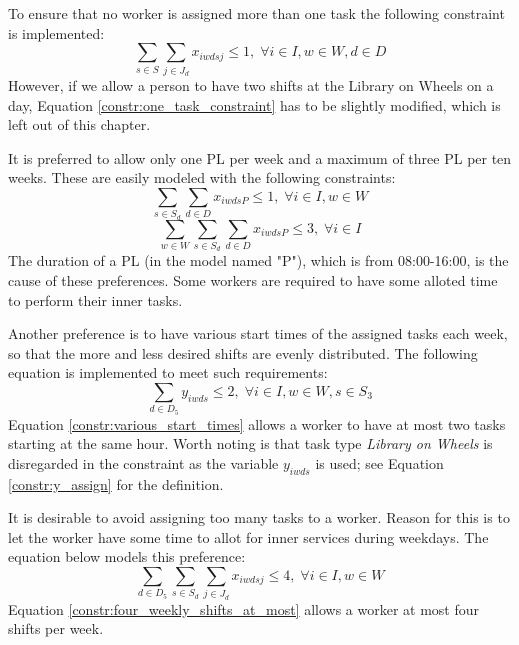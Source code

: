 To ensure that no worker is assigned more than one task the following constraint is implemented:
\begin{equation} \label{constr:one_task_constraint}
\sum_{s\in S}\sum_{j\in J_d} x_{iwdsj} \leq 1, \; \forall i\in I, w \in W, d\in D
\end{equation}
However, if we allow a person to have two shifts at the Library on Wheels on a day, Equation \ref{constr:one_task_constraint} has to be slightly modified, which is left out of this chapter.

It is preferred to allow only one PL per week and a maximum of three PL per ten weeks. These are easily modeled with the following constraints:
\begin{equation} \label{constr:one_PL}
\sum_{s \in S_d}\sum_{d \in D} x_{iwdsP} \leq 1, \; \forall i\in I, w \in W
\end{equation}
\begin{equation} \label{constr:three_PL}
\sum_{w \in W}\sum_{s \in S_d}\sum_{d \in D} x_{iwdsP} \leq 3, \; \forall i\in I
\end{equation}
The duration of a PL (in the model named "P"), which is from 08:00-16:00, is the cause of these preferences. Some workers are required to have some alloted time to perform their inner tasks.

Another preference is to have various start times of the assigned tasks each week, so that the more and less desired shifts are evenly distributed. The following equation is implemented to meet such requirements:
\begin{equation} \label{constr:various_start_times}
\sum_{d \in D_5} y_{iwds} \leq 2, \; \forall i\in I, w \in W, s \in S_3
\end{equation}
Equation \ref{constr:various_start_times} allows a worker to have at most two tasks starting at the same hour. Worth noting is that task type \textit{Library on Wheels} is disregarded in the constraint as the variable $y_{iwds}$ is used; see Equation \ref{constr:y_assign} for the definition.

It is desirable to avoid assigning too many tasks to a worker. Reason for this is to let the worker have some time to allot for inner services during weekdays. The equation below models this preference:
\begin{equation} \label{constr:four_weekly_shifts_at_most}
\sum_{d \in D_5}\sum_{s \in S_d}\sum_{j \in J_d} x_{iwdsj} \leq 4, \; \forall i\in I, w \in W
\end{equation}
Equation \ref{constr:four_weekly_shifts_at_most} allows a worker at most four shifts per week.


